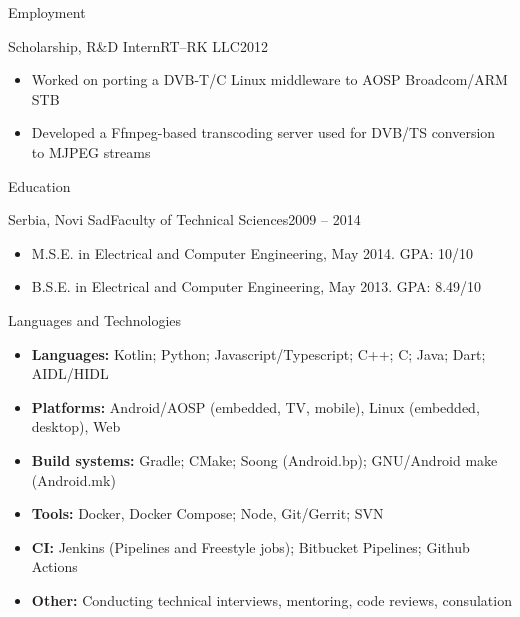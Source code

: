 \documentclass[]{mcdowellcv}
\begin{document}
\begin{cvsection}{Employment}
		\begin{cvsubsection}{Scholarship, R\&D Intern}{RT--RK LLC}{2012}
			\begin{itemize}
				\item Worked on porting a DVB-T/C Linux middleware to AOSP Broadcom/ARM STB
				\item Developed a Ffmpeg-based transcoding server used for DVB/TS conversion to MJPEG streams
			\end{itemize}
		\end{cvsubsection}

	\end{cvsection}

	\begin{cvsection}{Education}
		\begin{cvsubsection}{Serbia, Novi Sad}{Faculty of Technical Sciences}{2009 -- 2014}
			\begin{itemize}
				\item M.S.E. in Electrical and Computer Engineering, May 2014. GPA: 10/10
				\item B.S.E. in Electrical and Computer Engineering, May 2013. GPA: 8.49/10
			\end{itemize}
		\end{cvsubsection}
	\end{cvsection}

	\begin{cvsection}{Languages and Technologies}
		\begin{cvsubsection}{}{}{}
			\begin{itemize}
				\item \textbf{Languages:} Kotlin; Python; Javascript/Typescript; C++; C; Java; Dart; AIDL/HIDL
				\item \textbf{Platforms:} Android/AOSP (embedded, TV, mobile), Linux (embedded, desktop), Web
				\item \textbf{Build systems:} Gradle; CMake; Soong (Android.bp); GNU/Android make (Android.mk)
				\item \textbf{Tools:}  Docker, Docker Compose; Node, Git/Gerrit; SVN
				\item \textbf{CI:} Jenkins (Pipelines and Freestyle jobs); Bitbucket Pipelines; Github Actions
				\item \textbf{Other:} Conducting technical interviews, mentoring, code reviews, consulation
			\end{itemize}
		\end{cvsubsection}
	\end{cvsection}
\end{document}

